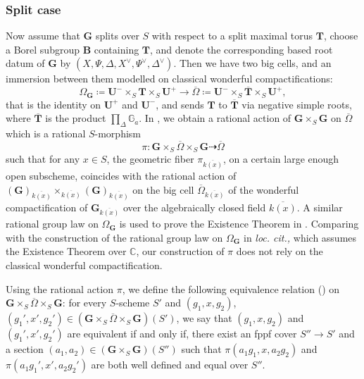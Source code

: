 \documentclass[11pt, reqno]{amsart}
\theoremstyle{plain}
\theoremstyle{definition}
\begin{document}
 \subsubsection{Split case}
 Now assume that $\mathbf{G}$ splits over $S$ with respect to a split maximal torus $\mathbf{T}$, choose a Borel subgroup $\mathbf{B}$ containing $\mathbf{T}$, and denote the corresponding based root datum of $\mathbf{G}$ by $(X,\Psi, \Delta, X^{\vee}, \Psi^{\vee}, \Delta^{\vee})$. Then we have two big cells, and an immersion between them modelled on classical wonderful compactifications:
$$\Omega_{\mathbf{G}}\coloneq\mathbf{U}^-\times_S \mathbf{T}\times_S \mathbf{U}^+\longrightarrow \overline{\Omega}\coloneq\mathbf{U}^-\times_S \overline{\mathbf{T}}\times_S \mathbf{U}^+,$$
that is the identity on $\mathbf{U}^+$ and $\mathbf{U}^-$, and sends $\mathbf{T}$ to $\overline{\mathbf{T}}$ via negative simple roots, where $\overline{\mathbf{T}}$ is the product $\prod_{\Delta} \mathbb{G}_a$.
In , we obtain a rational action of $\mathbf{G}\times_S \mathbf{G}$ on $\overline{\Omega}$ which is a rational $S$-morphism  $$\pi\colon \mathbf{G}\times_S\overline{\Omega}\times_S\mathbf{G}\dashrightarrow \overline{\Omega}$$
    such that for any $x\in S$, the geometric fiber $\pi_{\overline{k(x)}}$, on a certain large enough open subscheme, coincides with the rational action of $(\mathbf{G})_{\overline{k(x)}}\times_{\overline{k(x)}}(\mathbf{G})_{\overline{k(x)}}$ on the big cell $\overline{\Omega}_{\overline{k(x)}}$ of the wonderful compactification of ${\mathbf{G}}_{\overline{k(x)}}$ over the algebraically closed field $\overline{k(x)}$. A similar rational group law on $\Omega_{\mathbf{G}}$ is used to prove the Existence Theorem in  \cite[exposé~XXV]{SGA3III}. Comparing with the construction of the rational group law on $\Omega_{\mathbf{G}}$ in \emph{loc. cit.,} which assumes the Existence Theorem over $\mathbb{C}$, our construction of $\pi$ does not rely on the classical wonderful compactification.

Using the rational action $\pi$, we define the following equivalence relation () on $ \mathbf{G}\times_S\overline{\Omega}\times_S \mathbf{G}$:
     for every $S$-scheme $S'$ and $(g_1, x, g_2)$, $(g_1', x', g_2')\in( \mathbf{G}\times_S\overline{\Omega}\times_S \mathbf{G} )(S')$, we say that $(g_1, x, g_2)$ and $(g_1', x', g_2')$ are equivalent if and only if, there exist an fppf cover $S''\rightarrow S'$ and a section $(a_1, a_2)\in ( \mathbf{G}\times_S \mathbf{G})(S'')$   such that $\pi(a_1g_1,x,a_2g_2)$ and $\pi(a_1g_1',x',a_2g_2')$ are both well defined and equal over $S''$.
\end{document}
